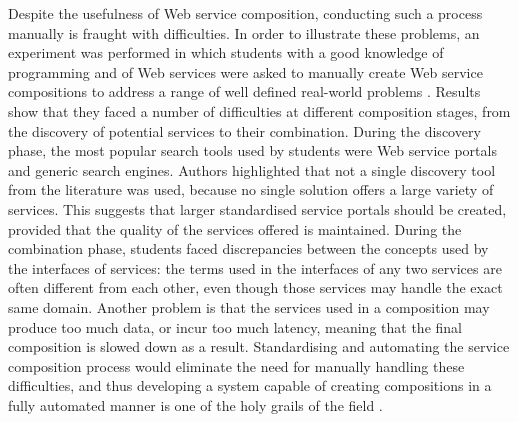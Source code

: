 Despite the usefulness of Web service composition, conducting such a process manually is fraught with difficulties. 
In order to illustrate these problems, an experiment was performed in which students with a good knowledge of programming and of Web services were asked to manually create Web service compositions to address a range of well defined real-world problems \cite{lu2007web}. Results show that they faced a number of difficulties at different composition stages, from the discovery of potential services to their combination. During the discovery phase, the most popular search tools used by students were Web service portals and generic search engines. Authors highlighted that not a single discovery tool from the literature was used, because no single solution offers a large variety of services. This suggests that larger standardised service portals should be created, provided that the quality of the services offered is maintained. During the combination phase, students faced discrepancies between the concepts used by the interfaces of services: the terms used in the interfaces of any two services are often different from each other, even though those services may handle the exact same domain. Another problem is that the services used in a composition may produce too much data, or incur too much latency, meaning that the final composition is slowed down as a result. Standardising and automating the service composition process would eliminate the need for manually handling these difficulties, and thus developing a system capable of creating compositions in a fully automated manner is one of the holy grails of the field \cite{milanovic2004current}.

